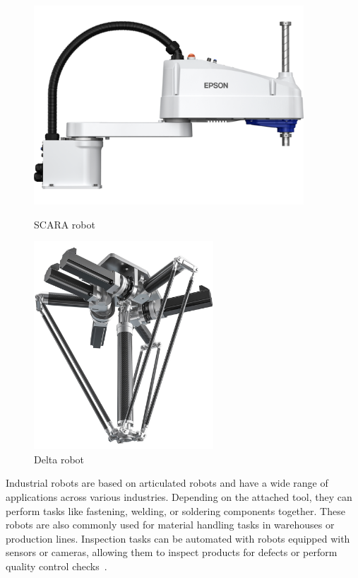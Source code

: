 \begin{figure}[H]	
	\centering
	\begin{minipage}{0.5\textwidth}
		\centering
		\includegraphics[width=0.9\textwidth]{figures/scara.png}
		\caption{SCARA robot}
		\label{Scara}
	\end{minipage}\hfill
	\begin{minipage}{0.5\textwidth}
		\centering
		\includegraphics[width=0.6\textwidth]{figures/delta.png}
		\caption{Delta robot}
		\label{Delta}
	\end{minipage}\par
\end{figure}



Industrial robots are based on articulated robots and have a wide range of applications across various industries. Depending on the attached tool, they can perform tasks like fastening, welding, or soldering components together. These robots are also commonly used for material handling tasks in warehouses or production lines. Inspection tasks can be automated with robots equipped with sensors or cameras, allowing them to inspect products for defects or perform quality control checks~\cite{Hagele.2016}.


